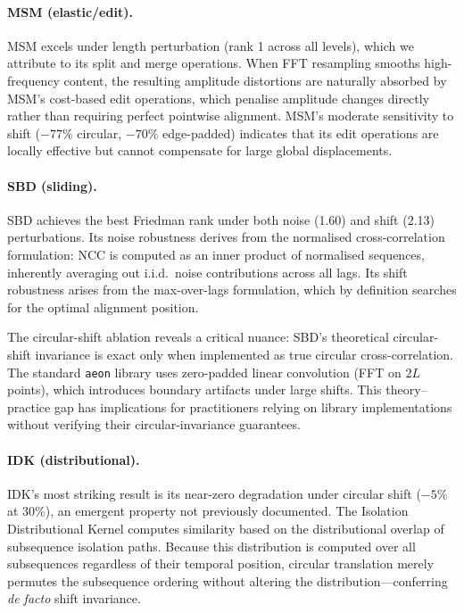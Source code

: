 \paragraph{MSM (elastic/edit).}
MSM excels under length perturbation (rank 1 across all levels), which we attribute to its split and merge operations.
When FFT resampling smooths high-frequency content, the resulting amplitude distortions are naturally absorbed by MSM's cost-based edit operations, which penalise amplitude changes directly rather than requiring perfect pointwise alignment.
MSM's moderate sensitivity to shift ($-77\%$ circular, $-70\%$ edge-padded) indicates that its edit operations are locally effective but cannot compensate for large global displacements.

\paragraph{SBD (sliding).}
SBD achieves the best Friedman rank under both noise (1.60) and shift (2.13) perturbations.
Its noise robustness derives from the normalised cross-correlation formulation: NCC is computed as an inner product of normalised sequences, inherently averaging out i.i.d.\ noise contributions across all lags.
Its shift robustness arises from the max-over-lags formulation, which by definition searches for the optimal alignment position.

The circular-shift ablation reveals a critical nuance: SBD's theoretical circular-shift invariance is exact only when implemented as true circular cross-correlation.
The standard \texttt{aeon} library uses zero-padded linear convolution (FFT on $2L$ points), which introduces boundary artifacts under large shifts.
This theory--practice gap has implications for practitioners relying on library implementations without verifying their circular-invariance guarantees.

\paragraph{IDK (distributional).}
IDK's most striking result is its near-zero degradation under circular shift ($-5\%$ at 30\%), an emergent property not previously documented.
The Isolation Distributional Kernel computes similarity based on the distributional overlap of subsequence isolation paths.
Because this distribution is computed over all subsequences regardless of their temporal position, circular translation merely permutes the subsequence ordering without altering the distribution---conferring \emph{de facto} shift invariance.

